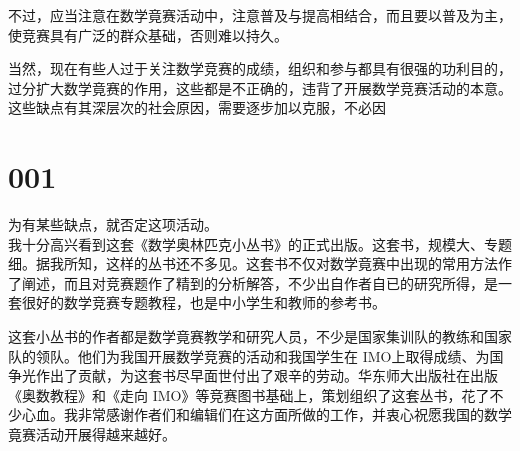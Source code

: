 \documentclass[10pt]{article}
\begin{document}
不过，应当注意在数学竟赛活动中，注意普及与提高相结合，而且要以普及为主，使竞赛具有广泛的群众基础，否则难以持久。

当然，现在有些人过于关注数学竞赛的成绩，组织和参与都具有很强的功利目的，过分扩大数学竟赛的作用，这些都是不正确的，违背了开展数学竞赛活动的本意。这些缺点有其深层次的社会原因，需要逐步加以克服，不必因

\section*{001}
为有某些缺点，就否定这项活动。\\
我十分高兴看到这套《数学奥林匹克小丛书》的正式出版。这套书，规模大、专题细。据我所知，这样的丛书还不多见。这套书不仅对数学竟赛中出现的常用方法作了阐述，而且对竞赛题作了精到的分析解答，不少出自作者自已的研究所得，是一套很好的数学竞赛专题教程，也是中小学生和教师的参考书。

这套小丛书的作者都是数学竟赛教学和研究人员，不少是国家集训队的教练和国家队的领队。他们为我国开展数学竞赛的活动和我国学生在 IMO上取得成绩、为国争光作出了贡献，为这套书尽早面世付出了艰辛的劳动。华东师大出版社在出版《奥数教程》和《走向 IMO》等竞赛图书基础上，策划组织了这套丛书，花了不少心血。我非常感谢作者们和编辑们在这方面所做的工作，并衷心祝愿我国的数学竟赛活动开展得越来越好。
\end{document}

